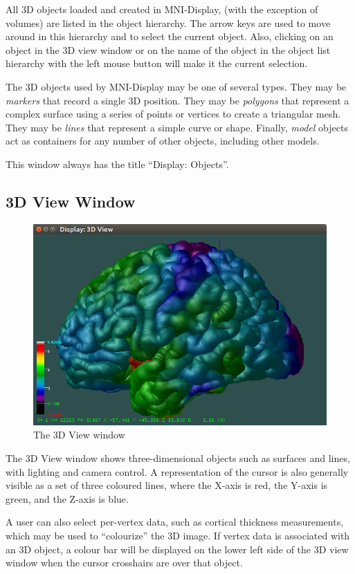 \documentclass[11pt,letterpaper]{article}
\newcommand{\display}{\mbox{MNI-Display}}
\begin{document}
All 3D objects loaded and created in \display{},
(with the exception of volumes) are listed in the object hierarchy. The
arrow keys are used to move around in this hierarchy and to select the
current object. Also, clicking on an object in the 3D view window or on the
name of the object in the object list hierarchy with the left mouse button
will make it the current selection.

The 3D objects used by \display{} may be one of several types. They may
be {\em markers} that record a single 3D position. They may be {\em
 polygons} that represent a complex surface using a series of points
or vertices to create a triangular mesh. They may be {\em lines} that
represent a simple curve or shape. Finally, {\em model} objects act as containers for any number of other objects, including other models.

This window always has the title ``Display: Objects''.

\subsection{3D View Window}

\begin{figure}
\centering
\includegraphics[width=0.7\linewidth]{display-3d-view.png}
\caption{The 3D View window}
\label{win3Dview}
\end{figure}

The 3D View window shows three-dimensional objects such as surfaces and
lines, with lighting and camera control. A representation of the cursor is 
also generally visible as a set of three coloured lines, where the X-axis is red, the Y-axis is green, and the Z-axis is blue.

A user can also select per-vertex data, such as cortical thickness
measurements, which may be used to ``colourize'' the 3D image. If vertex
data is associated with an 3D object, a colour bar will be displayed on
the lower left side of the 3D view window when the cursor crosshairs are
over that object.
\end{document}
